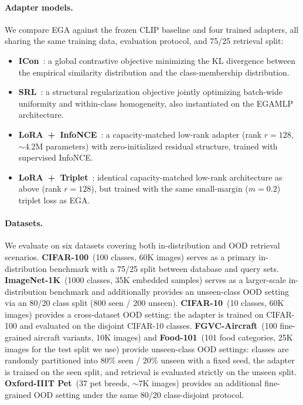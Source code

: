 \documentclass{article}
\begin{document}
\paragraph{Adapter models.}
We compare EGA against the frozen CLIP baseline and four trained adapters, all
sharing the same training data, evaluation protocol, and 75/25 retrieval split:
\begin{itemize}
	\item \textbf{ICon}~\cite{alshammariunifying}: a global contrastive
	      objective minimizing the KL divergence between the empirical similarity
	      distribution and the class-membership distribution.
	\item \textbf{SRL}~\cite{dong2025improve}: a structural regularization
	      objective jointly optimizing batch-wide uniformity and within-class
	      homogeneity, also instantiated on the EGAMLP architecture.
	\item \textbf{LoRA~+~InfoNCE}~\cite{hu2022lora,oord2018representation}: a capacity-matched low-rank adapter (rank $r=128$, $\sim$4.2M parameters) with zero-initialized residual structure, trained with supervised InfoNCE.
	\item \textbf{LoRA~+~Triplet}~\cite{hu2022lora}: identical capacity-matched low-rank architecture as above (rank $r=128$), but trained with the same small-margin ($m=0.2$) triplet loss as EGA.
\end{itemize}

\paragraph{Datasets.}
We evaluate on six datasets covering both in-distribution and OOD retrieval scenarios.
\textbf{CIFAR-100}~(100 classes, 60K images) serves as a primary in-distribution benchmark with a 75/25 split between database and query sets.
\textbf{ImageNet-1K}~(1000 classes, 35K embedded samples) serves as a larger-scale in-distribution benchmark and additionally provides an unseen-class OOD setting via an 80/20 class split (800 seen / 200 unseen).
\textbf{CIFAR-10}~(10 classes, 60K images) provides a cross-dataset OOD setting: the adapter is trained on CIFAR-100 and evaluated on the disjoint CIFAR-10 classes.
\textbf{FGVC-Aircraft}~(100 fine-grained aircraft variants, 10K images) and \textbf{Food-101}~(101 food categories, 25K images for the test split we use) provide unseen-class OOD settings: classes are randomly partitioned into $80\%$ seen / $20\%$ unseen with a fixed seed, the adapter is trained on the seen split, and retrieval is evaluated strictly on the unseen split.
\textbf{Oxford-IIIT Pet}~(37 pet breeds, $\sim$7K images) provides an additional fine-grained OOD setting under the same 80/20 class-disjoint protocol.
\end{document}
